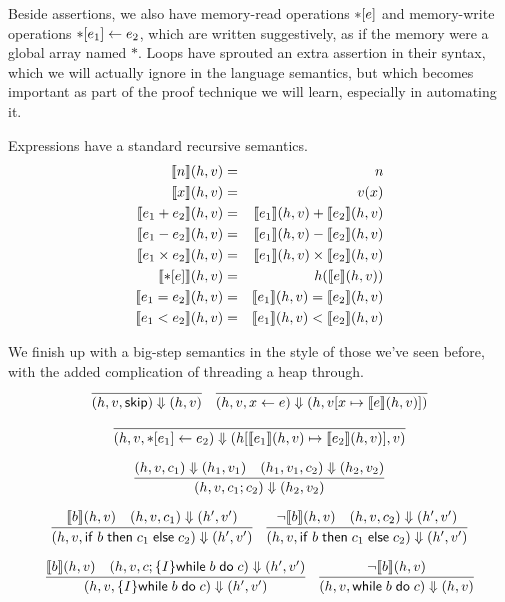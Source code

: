 \documentclass{amsbook}
\theoremstyle{definition}
\theoremstyle{remark}
\numberwithin{section}{chapter}
\numberwithin{equation}{chapter}
\begin{document}
Beside assertions, we also have memory-read operations ${*}[e]$ and memory-write operations ${*}[e_1] \leftarrow e_2$, which are written suggestively, as if the memory were a global array named $*$.
Loops have sprouted an extra assertion in their syntax, which we will actually ignore in the language semantics, but which becomes important as part of the proof technique we will learn, especially in automating it.

Expressions have a standard recursive semantics.
\begin{eqnarray*}
  {\left \llbracket n \right \rrbracket}(h, v) &=& n \\
  {\left \llbracket x \right \rrbracket}(h, v) &=& v(x) \\
  {\left \llbracket e_1 + e_2 \right \rrbracket}(h, v) &=& {\left \llbracket e_1 \right \rrbracket}(h, v) + {\left \llbracket e_2 \right \rrbracket}(h, v) \\
  {\left \llbracket e_1 - e_2 \right \rrbracket}(h, v) &=& {\left \llbracket e_1 \right \rrbracket}(h, v) - {\left \llbracket e_2 \right \rrbracket}(h, v) \\
  {\left \llbracket e_1 \times e_2 \right \rrbracket}(h, v) &=& {\left \llbracket e_1 \right \rrbracket}(h, v) \times {\left \llbracket e_2 \right \rrbracket}(h, v) \\
  {\left \llbracket {*}[e] \right \rrbracket}(h, v) &=& h({\left \llbracket e \right \rrbracket}(h, v)) \\
  {\left \llbracket e_1 = e_2 \right \rrbracket}(h, v) &=& {\left \llbracket e_1 \right \rrbracket}(h, v) = {\left \llbracket e_2 \right \rrbracket}(h, v) \\
  {\left \llbracket e_1 < e_2 \right \rrbracket}(h, v) &=& {\left \llbracket e_1 \right \rrbracket}(h, v) < {\left \llbracket e_2 \right \rrbracket}(h, v)
\end{eqnarray*}

We finish up with a big-step semantics in the style of those we've seen before, with the added complication of threading a heap through.
\encoding
$$\infer{\bigstep{(h, v, \skipe)}{(h, v)}}{}
\quad \infer{\bigstep{(h, v, \assign{x}{e})}{(h, \mupd{v}{x}{\denote{e}(h, v)})}}{}$$

$$\infer{\bigstep{(h, v, \writeto{e_1}{e_2})}{(\mupd{h}{\denote{e_1}(h, v)}{\denote{e_2}(h, v)}, v)}}{}$$

$$\infer{\bigstep{(h, v, c_1; c_2)}{(h_2, v_2)}}{
  \bigstep{(h, v, c_1)}{(h_1, v_1)}
  & \bigstep{(h_1, v_1, c_2)}{(h_2, v_2)}
}$$

$$\infer{\bigstep{(h, v, \ifte{b}{c_1}{c_2})}{(h', v')}}{
  \denote{b}(h, v)
  & \bigstep{(h, v, c_1)}{(h', v')}
}
\quad \infer{\bigstep{(h, v, \ifte{b}{c_1}{c_2})}{(h', v')}}{
  \neg \denote{b}(h, v)
  & \bigstep{(h, v, c_2)}{(h', v')}
}$$

$$\infer{\bigstep{(h, v, \{I\} \while{b}{c})}{(h', v')}}{
  \denote{b}(h, v)
  & \bigstep{(h, v, c; \{I\} \while{b}{c})}{(h', v')}
}
\quad \infer{\bigstep{(h, v, \while{b}{c})}{(h, v)}}{
  \neg \denote{b}(h, v)
}$$
\end{document}
